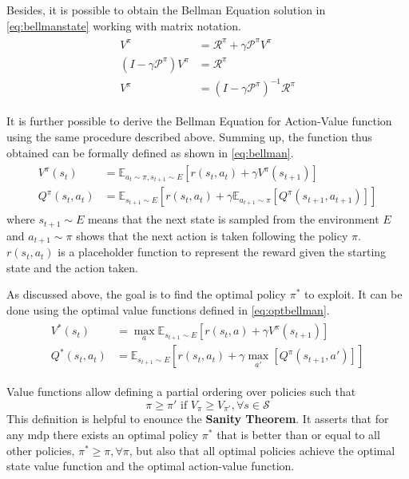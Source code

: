 Besides, it is possible to obtain the Bellman Equation solution in \vref{eq:bellmanstate} working with matrix notation.
\begin{align} \label{eq:bellmanstate}
	\begin{split}
	V^\pi &= \mathcal{R}^\pi + \gamma \mathcal{P}^\pi V^\pi \\
	(I - \gamma\mathcal{P}^\pi)V^\pi &= \mathcal{R}^\pi \\
	V^\pi &= (I - \gamma\mathcal{P}^\pi)^{-1}\mathcal{R}^\pi
	\end{split}
\end{align}

It is further possible to derive the Bellman Equation for Action-Value function using the same procedure described above. Summing up, the function thus obtained can be formally defined as shown in \vref{eq:bellman}.
\begin{align} \label{eq:bellman}
	\begin{split}
V^\pi(s_t) &= \mathbb{E}_{a_t \sim \pi, s_{t+1} \sim E}[r(s_t, a_t) + \gamma V^\pi(s_{t+1})] \\
Q^\pi(s_t,a_t) &= \mathbb{E}_{s_{t+1} \sim E}[r(s_t, a_t) + \gamma \mathbb{E}_{ a_{t+1} \sim \pi}[Q^\pi(s_{t+1}, a_{t+1})]]
\end{split}
\end{align}
where $s_{t+1}\sim \mathit{E}$ means that the next state is sampled from the environment $E$ and $a_{t+1}\sim \pi$ shows that the next action is taken following the policy $\pi$. $r(s_t, a_t)$ is a placeholder function to represent the reward given the starting state and the action taken.

As discussed above, the goal is to find the optimal policy $\pi^*$ to exploit. It can be done using the optimal value functions defined in \vref{eq:optbellman}. 
\begin{align} \label{eq:optbellman}
\begin{split}
V^*(s_t) &= \max_{a} \mathbb{E}_{s_{t+1} \sim E}[r(s_t, a) + \gamma V^\pi(s_{t+1})] \\
Q^*(s_t,a_t) &= \mathbb{E}_{s_{t+1} \sim E}[r(s_t, a_t) + \gamma \max_{a'}[Q^\pi(s_{t+1}, a')]]
\end{split}
\end{align}

Value functions allow defining a partial ordering over policies such that \[\pi \ge \pi' \text{ if } V_\pi \ge V_{\pi'},\forall s \in \mathcal{S}\]
This definition is helpful to enounce the \textbf{Sanity Theorem}. It asserts that for any \acrshort{mdp} there exists an optimal policy $\pi^*$ that is better than or equal to all other policies, $\pi^* \ge \pi, \forall \pi$, but also that all optimal policies achieve the optimal state value function and the optimal action-value function.

